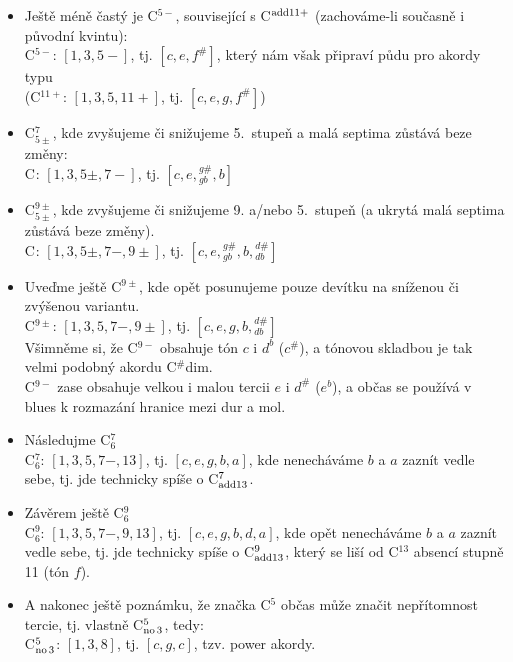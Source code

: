 \documentclass[12pt]{article}
\begin{document}
\begin{itemize}
  \item Ještě méně častý je C${}^{5-}$, související s C${}^{\rm add11+}$ (zachováme-li současně i původní kvintu):
   \\ C${}^{5-}$: $[1,3,5-]$, tj. $[c,e,f^{\#}]$, který nám však připraví půdu pro akordy typu
   \\ (C${}^{11+}$: $[1,3,5,11+]$, tj. $[c,e,g,f^{\#}]$)
  \item C${}^{7}_{5\pm}$, kde zvyšujeme či snižujeme 5.~stupeň a malá septima zůstává beze změny:
   \\ C${}^{}$: $[1,3,5\pm,7-]$, tj. $[c,e,{}^{g\#}_{gb},b]$
  \item C${}^{9\pm}_{5\pm}$, kde zvyšujeme či snižujeme 9. a/nebo 5.~stupeň (a ukrytá malá septima zůstává beze změny).
   \\ C${}^{}$: $[1,3,5\pm,7-,9\pm]$, tj. $[c,e,{}^{g\#}_{gb},b,{}^{d\#}_{db}]$
  \item Uveďme ještě C${}^{9\pm}$, kde opět posunujeme pouze devítku na sníženou či zvýšenou variantu.
   \\ C${}^{9\pm}$: $[1,3,5,7-,9\pm]$, tj. $[c,e,g,b,{}^{d\#}_{db}]$
   \\ Všimněme si, že C${}^{9-}$ obsahuje tón $c$ i $d^b$ ($c^\#$), a tónovou skladbou je tak velmi podobný akordu C${}^\#$dim.
   \\ C${}^{9-}$ zase obsahuje velkou i malou tercii $e$ i $d^\#$ ($e^b$), a občas se používá v blues k rozmazání hranice mezi dur a mol.
  \item Následujme C${}^{7}_{6}$
   \\ C${}^{7}_{6}$: $[1,3,5,7-,13]$, tj. $[c,e,g,b,a]$, kde nenecháváme $b$ a $a$ zaznít vedle sebe, tj. jde technicky spíše o C${}^{7}_{\rm add 13}$.

  \item Závěrem ještě C${}^{9}_{6}$
   \\ C${}^{9}_{6}$: $[1,3,5,7-,9,13]$, tj. $[c,e,g,b,d,a]$, kde opět nenecháváme $b$ a $a$ zaznít vedle sebe, tj. jde technicky spíše o C${}^{9}_{\rm add 13}$, který se liší od C${}^{13}$ absencí stupně 11 (tón $f$).

  \item A nakonec ještě poznámku, že značka C${}^5$ občas může značit nepřítomnost tercie, tj. vlastně C${}^5_{\rm no\,3}$, tedy:
   \\ C${}^{5}_{\rm no\,3}$: $[1,3,8]$, tj. $[c,g,c]$, tzv. power akordy.



\end{itemize}
\end{document}
